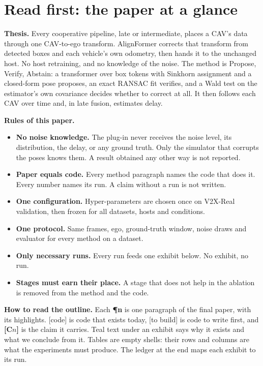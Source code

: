 \section*{Read first: the paper at a glance}

\noindent\textbf{Thesis.} Every cooperative pipeline, late or intermediate, places a CAV's data through one CAV-to-ego transform. AlignFormer corrects that transform from detected boxes and each vehicle's own odometry, then hands it to the unchanged host. No host retraining, and no knowledge of the noise. The method is Propose, Verify, Abstain: a transformer over box tokens with Sinkhorn assignment and a closed-form pose proposes, an exact RANSAC fit verifies, and a Wald test on the estimator's own covariance decides whether to correct at all. It then follows each CAV over time and, in late fusion, estimates delay.

\medskip\noindent\textbf{Rules of this paper.}
\begin{itemize}\setlength\itemsep{1pt}
  \item[\textbf{R1}] \textbf{No noise knowledge.} The plug-in never receives the noise level, its distribution, the delay, or any ground truth. Only the simulator that corrupts the poses knows them. A result obtained any other way is not reported.
  \item[\textbf{R2}] \textbf{Paper equals code.} Every method paragraph names the code that does it. Every number names its run. A claim without a run is not written.
  \item[\textbf{R3}] \textbf{One configuration.} Hyper-parameters are chosen once on V2X-Real validation, then frozen for all datasets, hosts and conditions.
  \item[\textbf{R4}] \textbf{One protocol.} Same frames, ego, ground-truth window, noise draws and evaluator for every method on a dataset.
  \item[\textbf{R5}] \textbf{Only necessary runs.} Every run feeds one exhibit below. No exhibit, no run.
  \item[\textbf{R6}] \textbf{Stages must earn their place.} A stage that does not help in the ablation is removed from the method and the code.
\end{itemize}

\medskip\noindent\textbf{How to read the outline.} Each \textcolor{outlineblue}{\textbf{\P n}} is one paragraph of the final paper, with its highlights. \textcolor{outlinegreen}{\footnotesize[code]} is code that exists today, \textcolor{outlineorange}{\footnotesize[to build]} is code to write first, and \textcolor{red!70!black}{\footnotesize\textbf{[C$n$]}} is the claim it carries. \textcolor{outlineteal}{Teal text} under an exhibit says why it exists and what we conclude from it. Tables are empty shells: their rows and columns are what the experiments must produce. The ledger at the end maps each exhibit to its run.

